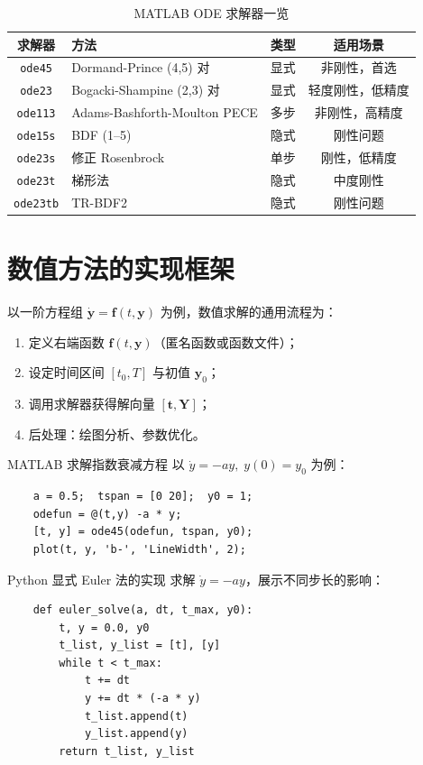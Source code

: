 \begin{table}[H]
	\centering
	\caption{MATLAB ODE 求解器一览}
	\begin{tabular}{clcc}
		\toprule
		求解器 & 方法 & 类型 & 适用场景 \\
		\midrule
		\texttt{ode45} & Dormand-Prince (4,5) 对 & 显式 & 非刚性，首选 \\
		\texttt{ode23} & Bogacki-Shampine (2,3) 对 & 显式 & 轻度刚性，低精度 \\
		\texttt{ode113} & Adams-Bashforth-Moulton PECE & 多步 & 非刚性，高精度 \\
		\texttt{ode15s} & BDF (1--5) & 隐式 & 刚性问题 \\
		\texttt{ode23s} & 修正 Rosenbrock & 单步 & 刚性，低精度 \\
		\texttt{ode23t} & 梯形法 & 隐式 & 中度刚性 \\
		\texttt{ode23tb} & TR-BDF2 & 隐式 & 刚性问题 \\
		\bottomrule
	\end{tabular}
\end{table}

\section{数值方法的实现框架}

以一阶方程组 $\dot{\mathbf{y}} = \mathbf{f}(t, \mathbf{y})$ 为例，数值求解的通用流程为：

\begin{enumerate}
	\item 定义右端函数 $\mathbf{f}(t, \mathbf{y})$（匿名函数或函数文件）；
	\item 设定时间区间 $[t_0, T]$ 与初值 $\mathbf{y}_0$；
	\item 调用求解器获得解向量 $[\mathbf{t}, \mathbf{Y}]$；
	\item 后处理：绘图分析、参数优化。
\end{enumerate}

\begin{example}{MATLAB 求解指数衰减方程}
	以 $\dot{y} = -a y, \; y(0) = y_0$ 为例：
	\begin{verbatim}
	a = 0.5;  tspan = [0 20];  y0 = 1;
	odefun = @(t,y) -a * y;
	[t, y] = ode45(odefun, tspan, y0);
	plot(t, y, 'b-', 'LineWidth', 2);
	\end{verbatim}
\end{example}

\begin{example}{Python 显式 Euler 法的实现}
	求解 $\dot{y} = -a y$，展示不同步长的影响：
	\begin{verbatim}
	def euler_solve(a, dt, t_max, y0):
	    t, y = 0.0, y0
	    t_list, y_list = [t], [y]
	    while t < t_max:
	        t += dt
	        y += dt * (-a * y)
	        t_list.append(t)
	        y_list.append(y)
	    return t_list, y_list
	\end{verbatim}
\end{example}
